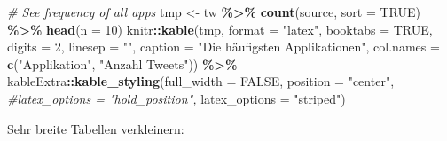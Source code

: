 \documentclass[
  11pt,
]{article}
\newenvironment{Shaded}{\begin{snugshade}}{\end{snugshade}}
\newcommand{\CommentTok}[1]{\textcolor[rgb]{0.56,0.35,0.01}{\textit{#1}}}
\newcommand{\DataTypeTok}[1]{\textcolor[rgb]{0.13,0.29,0.53}{#1}}
\newcommand{\DecValTok}[1]{\textcolor[rgb]{0.00,0.00,0.81}{#1}}
\newcommand{\KeywordTok}[1]{\textcolor[rgb]{0.13,0.29,0.53}{\textbf{#1}}}
\newcommand{\NormalTok}[1]{#1}
\newcommand{\OperatorTok}[1]{\textcolor[rgb]{0.81,0.36,0.00}{\textbf{#1}}}
\newcommand{\OtherTok}[1]{\textcolor[rgb]{0.56,0.35,0.01}{#1}}
\newcommand{\StringTok}[1]{\textcolor[rgb]{0.31,0.60,0.02}{#1}}
\begin{document}
\small

\linespread{1}

\begin{Shaded}
\begin{Highlighting}[]
\CommentTok{\# See frequency of all apps}
\NormalTok{tmp \textless{}{-}}\StringTok{ }\NormalTok{tw }\OperatorTok{\%\textgreater{}\%}\StringTok{ }\KeywordTok{count}\NormalTok{(source, }\DataTypeTok{sort =} \OtherTok{TRUE}\NormalTok{) }\OperatorTok{\%\textgreater{}\%}\StringTok{ }
\StringTok{  }\KeywordTok{head}\NormalTok{(}\DataTypeTok{n =} \DecValTok{10}\NormalTok{)}
\NormalTok{knitr}\OperatorTok{::}\KeywordTok{kable}\NormalTok{(tmp, }\DataTypeTok{format =} \StringTok{"latex"}\NormalTok{, }\DataTypeTok{booktabs =} \OtherTok{TRUE}\NormalTok{, }\DataTypeTok{digits =} \DecValTok{2}\NormalTok{, }\DataTypeTok{linesep =} \StringTok{""}\NormalTok{,}
             \DataTypeTok{caption =} \StringTok{"Die häufigsten Applikationen"}\NormalTok{,}
             \DataTypeTok{col.names =} \KeywordTok{c}\NormalTok{(}\StringTok{"Applikation"}\NormalTok{, }\StringTok{"Anzahl Tweets"}\NormalTok{)) }\OperatorTok{\%\textgreater{}\%}
\StringTok{  }\NormalTok{kableExtra}\OperatorTok{::}\KeywordTok{kable\_styling}\NormalTok{(}\DataTypeTok{full\_width =} \OtherTok{FALSE}\NormalTok{, }
                            \DataTypeTok{position =} \StringTok{"center"}\NormalTok{,}
                            \CommentTok{\#latex\_options = "hold\_position",}
                            \DataTypeTok{latex\_options =} \StringTok{"striped"}\NormalTok{)}
\end{Highlighting}
\end{Shaded}

\linespread{1.5}

\normalsize

Sehr breite Tabellen verkleinern:

\small

\linespread{1}
\end{document}
